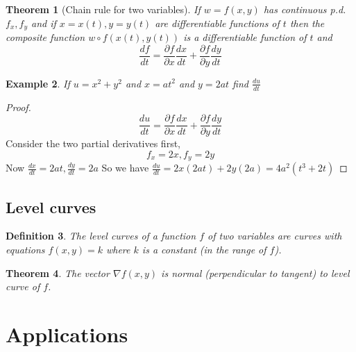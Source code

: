 \documentclass[oneside,11pt,pdftex]{book}%
\numberwithin{equation}{section}
\newtheorem{theorem}{Theorem}[chapter]%
\newtheorem{example}[theorem]{Example}
\newtheorem{definition}[theorem]{Definition}
\numberwithin{section}{chapter}
\numberwithin{equation}{chapter}
\begin{document}
\begin{theorem}[Chain rule for two variables]
	If $ w=f(x,y) $ has continuous p.d. $ f_x , f_y$ and if $ x=x(t), y=y(t) $ are differentiable functions of $ t $ then the composite function $ w \circ f(x(t), y(t)) $ is a differentiable function of $ t $ and 
	\[ \frac{d f}{dt}=\frac{\partial f}{\partial x}\frac{dx}{dt}+\frac{\partial f}{\partial y}\frac{dy}{dt} \]
\end{theorem}

\begin{example}
	If $ u=x^2+y^2 $ and $ x=at^2 $ and $ y=2at $ find $ \frac{du}{dt} $
\end{example}
\begin{proof}
	\[ \frac{du}{dt}=\frac{\partial f }{\partial x} \frac{dx}{dt}+ \frac{\partial f}{\partial y}\frac{dy}{dt}\]
	Consider the two partial derivatives first,
	\[ f_x=2x, f_y=2y \]
	Now $ \frac{dx}{dt} = 2at, \frac{dy}{dt}=2a$
	So we have $ \frac{du}{dt}=2x(2at)+2y(2a)=4a^2(t^3+2t) $
\end{proof}

\section{Level curves}
\begin{definition}
	The level curves of a function $ f $ of two variables are curves with equations $ f(x,y)=k $ where $ k $ is a constant (in the range of $ f $).
\end{definition}

\begin{theorem}
	The vector $ \nabla f(x,y) $ is normal (perpendicular to tangent) to level curve of $ f $.
\end{theorem}

\chapter{Applications}
\backmatter
\end{document}
